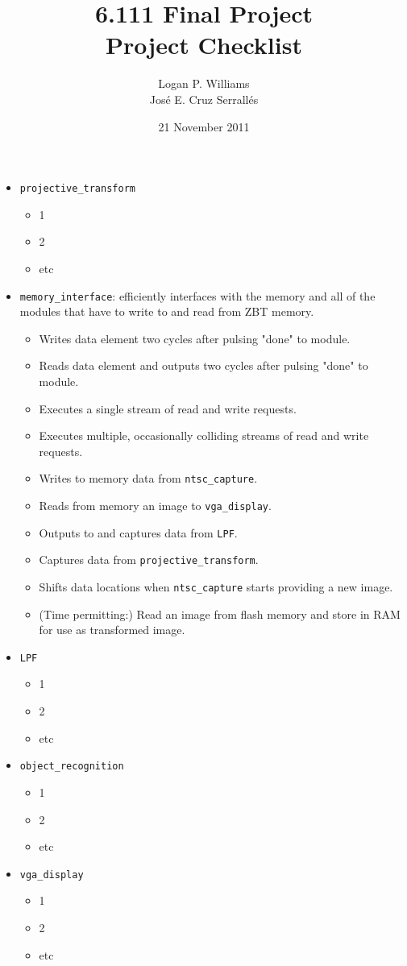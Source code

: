 \documentclass{article}
\title{6.111 Final Project\\Project Checklist}
\date{21 November 2011}
\author{Logan P. Williams\\Jos\'{e} E. Cruz Serrall\'{e}s}
\begin{document}
\maketitle

\begin{itemize}
\item[] {\tt projective\_transform}
	\begin{itemize}
	\item 1
	\item 2
	\item etc
	\end{itemize}

\item[] {\tt memory\_interface}: efficiently interfaces with the memory and all of the modules that have to write to and read from ZBT memory.
	\begin{itemize}
	\item Writes data element two cycles after pulsing "done" to module.
	\item Reads data element and outputs two cycles after pulsing "done" to module.
	\item Executes a single stream of read and write requests.
	\item Executes multiple, occasionally colliding streams of read and write requests.
	\item Writes to memory data from {\tt ntsc\_capture}.
	\item Reads from memory an image to {\tt vga\_display}.
	\item Outputs to and captures data from {\tt LPF}.
	\item Captures data from {\tt projective\_transform}.
	\item Shifts data locations when {\tt ntsc\_capture} starts providing a new image.
	\item (Time permitting:) Read an image from flash memory and store in RAM for use as transformed image.
	\end{itemize}

\item[] {\tt LPF}
	\begin{itemize}
	\item 1
	\item 2
	\item etc
	\end{itemize}

\item[] {\tt object\_recognition}
	\begin{itemize}
	\item 1
	\item 2
	\item etc
	\end{itemize}

\item[] {\tt vga\_display}
	\begin{itemize}
	\item 1
	\item 2
	\item etc
	\end{itemize}

\end{itemize}
\end{document}
